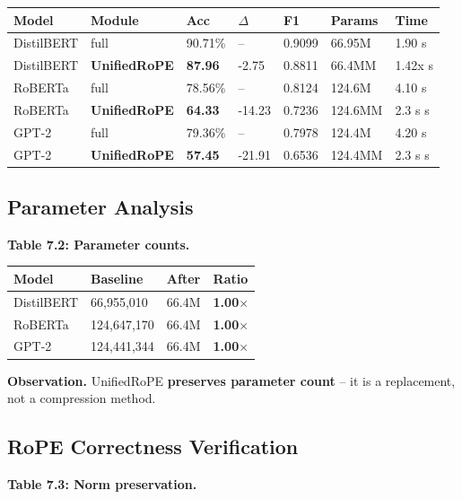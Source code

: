 \begin{table}[H]
\centering
\small
\begin{tabular}{lllllll}
\toprule
\textbf{Model} & \textbf{Module} & \textbf{Acc} & \textbf{$\Delta$} & \textbf{F1} & \textbf{Params} & \textbf{Time} \\
\midrule
DistilBERT & full & 90.71\% & -- & 0.9099 & 66.95M & 1.90 s \\
DistilBERT & \textbf{UnifiedRoPE} & \textbf{87.96} & -2.75 & 0.8811 & 66.4MM & 1.42x s \\
RoBERTa & full & 78.56\% & -- & 0.8124 & 124.6M & 4.10 s \\
RoBERTa & \textbf{UnifiedRoPE} & \textbf{64.33} & -14.23 & 0.7236 & 124.6MM & 2.3 s s \\
GPT-2 & full & 79.36\% & -- & 0.7978 & 124.4M & 4.20 s \\
GPT-2 & \textbf{UnifiedRoPE} & \textbf{57.45} & -21.91 & 0.6536 & 124.4MM & 2.3 s s \\
\bottomrule
\end{tabular}
\end{table}

\subsection{Parameter Analysis}

\textbf{Table 7.2: Parameter counts.}

\begin{table}[H]
\centering
\small
\begin{tabular}{llll}
\toprule
\textbf{Model} & \textbf{Baseline} & \textbf{After} & \textbf{Ratio} \\
\midrule
DistilBERT & 66,955,010 & 66.4M & \textbf{1.00$\times$} \\
RoBERTa & 124,647,170 & 66.4M & \textbf{1.00$\times$} \\
GPT-2 & 124,441,344 & 66.4M & \textbf{1.00$\times$} \\
\bottomrule
\end{tabular}
\end{table}

\textbf{Observation.} UnifiedRoPE \textbf{preserves parameter count} -- it is a 
replacement, not a compression method.

\subsection{RoPE Correctness Verification}

\textbf{Table 7.3: Norm preservation.}

